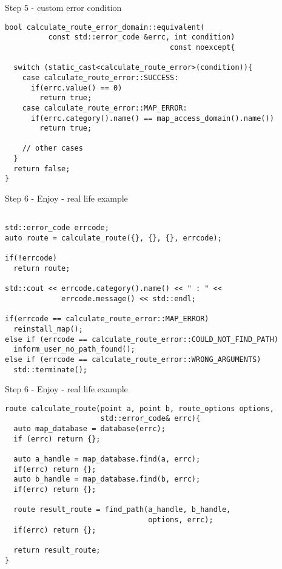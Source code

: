 \documentclass[10pt]{beamer}
\begin{document}
\begin{frame}[fragile]{Step 5 - custom error condition}
	\begin{verbatim}
bool calculate_route_error_domain::equivalent(
          const std::error_code &errc, int condition) 
                                      const noexcept{
                                      
  switch (static_cast<calculate_route_error>(condition)){
    case calculate_route_error::SUCCESS:
      if(errc.value() == 0)
        return true;
    case calculate_route_error::MAP_ERROR:
      if(errc.category().name() == map_access_domain().name())
        return true;
        
    // other cases
  }
  return false;
}
	\end{verbatim}
\end{frame}

\begin{frame}[fragile]{Step 6 - Enjoy - real life example}
	\begin{verbatim}

std::error_code errcode;
auto route = calculate_route({}, {}, {}, errcode);

if(!errcode)
  return route;

std::cout << errcode.category().name() << " : " <<
             errcode.message() << std::endl;

if(errcode == calculate_route_error::MAP_ERROR)
  reinstall_map();
else if (errcode == calculate_route_error::COULD_NOT_FIND_PATH)
  inform_user_no_path_found();
else if (errcode == calculate_route_error::WRONG_ARGUMENTS)
  std::terminate();
	\end{verbatim}
\end{frame}

\begin{frame}[fragile]{Step 6 - Enjoy - real life example}
	\begin{verbatim}
route calculate_route(point a, point b, route_options options,
                      std::error_code& errc){
  auto map_database = database(errc);
  if (errc) return {};

  auto a_handle = map_database.find(a, errc);
  if(errc) return {};
  auto b_handle = map_database.find(b, errc);
  if(errc) return {};

  route result_route = find_path(a_handle, b_handle,
                                 options, errc);
  if(errc) return {};

  return result_route;
}
	\end{verbatim}
\end{frame}
\end{document}
